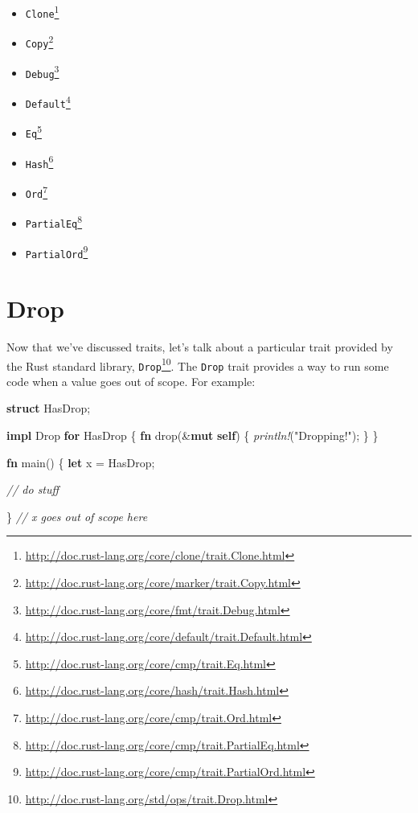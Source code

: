 \documentclass[a4paper,]{book}
\renewcommand*{\hypertarget}[3][\ar]{%
  \def\ar{#2}%
  \label{#1}%
  #3}
\newenvironment{Shaded}{\begin{snugshade}}{\end{snugshade}}
\newcommand{\KeywordTok}[1]{\textcolor[rgb]{0.13,0.29,0.53}{\textbf{{#1}}}}
\newcommand{\StringTok}[1]{\textcolor[rgb]{0.31,0.60,0.02}{{#1}}}
\newcommand{\CommentTok}[1]{\textcolor[rgb]{0.56,0.35,0.01}{\textit{{#1}}}}
\newcommand{\BuiltInTok}[1]{{#1}}
\newcommand{\PreprocessorTok}[1]{\textcolor[rgb]{0.56,0.35,0.01}{\textit{{#1}}}}
\newcommand{\NormalTok}[1]{{#1}}
\renewcommand{\href}[2]{#2\footnote{\url{#1}}}
\providecommand{\tightlist}{%
  \setlength{\itemsep}{0pt}\setlength{\parskip}{0pt}}
\begin{document}
\begin{itemize}
\tightlist
\item
  \href{http://doc.rust-lang.org/core/clone/trait.Clone.html}{\texttt{Clone}}
\item
  \href{http://doc.rust-lang.org/core/marker/trait.Copy.html}{\texttt{Copy}}
\item
  \href{http://doc.rust-lang.org/core/fmt/trait.Debug.html}{\texttt{Debug}}
\item
  \href{http://doc.rust-lang.org/core/default/trait.Default.html}{\texttt{Default}}
\item
  \href{http://doc.rust-lang.org/core/cmp/trait.Eq.html}{\texttt{Eq}}
\item
  \href{http://doc.rust-lang.org/core/hash/trait.Hash.html}{\texttt{Hash}}
\item
  \href{http://doc.rust-lang.org/core/cmp/trait.Ord.html}{\texttt{Ord}}
\item
  \href{http://doc.rust-lang.org/core/cmp/trait.PartialEq.html}{\texttt{PartialEq}}
\item
  \href{http://doc.rust-lang.org/core/cmp/trait.PartialOrd.html}{\texttt{PartialOrd}}
\end{itemize}

\hypertarget{sec--drop}{\section{Drop}\label{sec--drop}}

Now that we've discussed traits, let's talk about a particular trait
provided by the Rust standard library,
\href{http://doc.rust-lang.org/std/ops/trait.Drop.html}{\texttt{Drop}}.
The \texttt{Drop} trait provides a way to run some code when a value
goes out of scope. For example:

\begin{Shaded}
\begin{Highlighting}[]
\KeywordTok{struct} \NormalTok{HasDrop;}

\KeywordTok{impl} \BuiltInTok{Drop} \KeywordTok{for} \NormalTok{HasDrop \{}
    \KeywordTok{fn} \NormalTok{drop(&}\KeywordTok{mut} \KeywordTok{self}\NormalTok{) \{}
        \PreprocessorTok{println!}\NormalTok{(}\StringTok{"Dropping!"}\NormalTok{);}
    \NormalTok{\}}
\NormalTok{\}}

\KeywordTok{fn} \NormalTok{main() \{}
    \KeywordTok{let} \NormalTok{x = HasDrop;}

    \CommentTok{// do stuff}

\NormalTok{\} }\CommentTok{// x goes out of scope here}
\end{Highlighting}
\end{Shaded}
\end{document}
